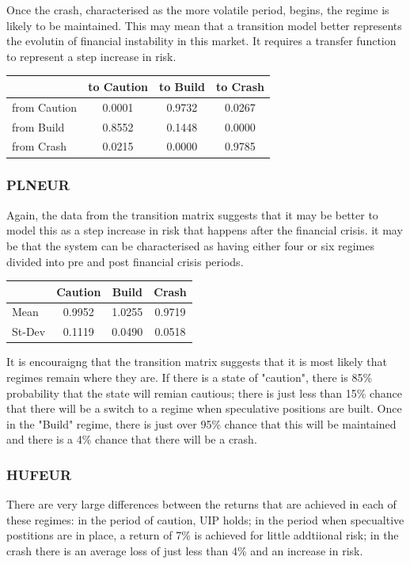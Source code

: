 \documentclass[12pt, a4paper, oneside]{article} %
\begin{document}
Once the crash, characterised as the more volatile period, begins, the regime is likely to be maintained.  This may mean that a transition model better represents the evolutin of financial instability in this market. It requires a transfer function to represent a step increase in risk. 

 \begin{centering}
 \begin{tabular}{l c c c}
 & to Caution & to Build & to Crash\\
 \hline
 from Caution & 0.0001 & 0.9732 & 0.0267\\
 from Build & 0.8552 & 0.1448 & 0.0000\\
 from Crash & 0.0215 & 0.0000 & 0.9785
 \end{tabular}
 \end{centering}
 \subsubsection{PLNEUR}
Again, the data from the transition matrix suggests that it may be better to model this as a step increase in risk that happens after the financial crisis.  it may be that the system can be characterised as having either four or six regimes divided into pre and post financial crisis periods. 

\begin{centering}
 \begin{tabular}{l c c c}
 & Caution & Build & Crash \\
 \hline
 Mean & 0.9952 & 1.0255 & 0.9719\\
 St-Dev & 0.1119 & 0.0490 & 0.0518\\
 \end{tabular}
 \end{centering}

It is encouraigng that the transition matrix suggests that it is most likely that regimes remain where they are.  If there is a state of "caution", there is 85\% probability that the state will remian cautious; there is just less than 15\% chance that there will be a switch to a regime when speculative positions are built.  Once in the "Build" regime, there is just over 95\% chance that this will be maintained and there is a 4\% chance that there will be a crash.  

\subsubsection{HUFEUR}
There are very large differences between the returns that are achieved in each of these regimes: in the period of caution, UIP holds; in the period when specualtive postitions are in place, a return of 7\% is achieved for little addtiional risk; in the crash there is an average loss of just less than 4\% and an increase in risk. 
\end{document}
